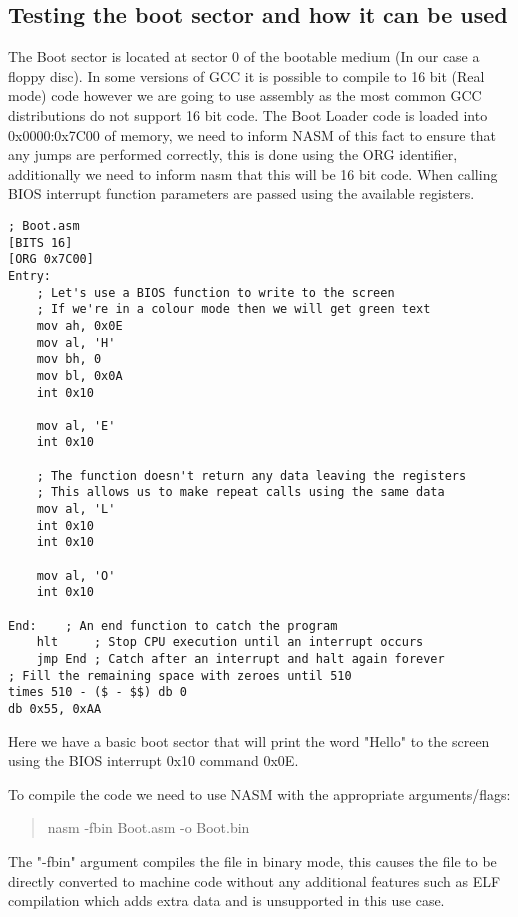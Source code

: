 \documentclass[10pt,a4paper]{article}
\begin{document}
\newpage

\subsection{Testing the boot sector and how it can be used}
The Boot sector is located at sector 0 of the bootable medium (In our case a floppy disc). In some versions of GCC it is possible to compile to 16 bit (Real mode) code however we are going to use assembly as the most common GCC distributions do not support 16 bit code. The Boot Loader code is loaded into 0x0000:0x7C00 of memory, we need to inform NASM of this fact to ensure that any jumps are performed correctly, this is done using the ORG identifier, additionally we need to inform nasm that this will be 16 bit code. When calling BIOS interrupt function parameters are passed using the available registers.

\begin{verbatim}
; Boot.asm
[BITS 16]
[ORG 0x7C00]
Entry:
	; Let's use a BIOS function to write to the screen
	; If we're in a colour mode then we will get green text
	mov ah, 0x0E
	mov al, 'H'
	mov bh, 0
	mov bl, 0x0A
	int 0x10
	
	mov al, 'E'
	int 0x10
	
	; The function doesn't return any data leaving the registers 
	; This allows us to make repeat calls using the same data	
	mov al, 'L'
	int 0x10
	int 0x10
	
	mov al, 'O'
	int 0x10

End:    ; An end function to catch the program
	hlt	    ; Stop CPU execution until an interrupt occurs
	jmp End ; Catch after an interrupt and halt again forever
; Fill the remaining space with zeroes until 510
times 510 - ($ - $$) db 0
db 0x55, 0xAA
\end{verbatim}

Here we have a basic boot sector that will print the word "Hello" to the screen using the BIOS interrupt 0x10 command 0x0E.

To compile the code we need to use NASM with the appropriate arguments/flags:
\begin{quote}
nasm -fbin Boot.asm -o Boot.bin
\end{quote}
The "-fbin" argument compiles the file in binary mode, this causes the file to be directly converted to machine code without any additional features such as ELF compilation which adds extra data and is unsupported in this use case.

\newpage
\end{document}
